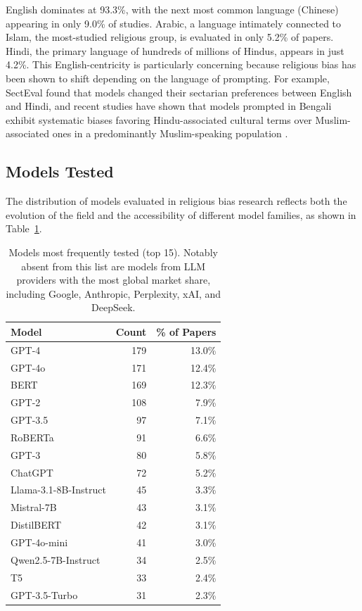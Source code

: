\documentclass[]{fairmeta}
\begin{document}
English dominates at 93.3\%, with the next most common language (Chinese) appearing in only 9.0\% of studies. Arabic, a language intimately connected to Islam, the most-studied religious group, is evaluated in only 5.2\% of papers. Hindi, the primary language of hundreds of millions of Hindus, appears in just 4.2\%. This English-centricity is particularly concerning because religious bias has been shown to shift depending on the language of prompting. For example, SectEval \citep{maheshwari2026} found that models changed their sectarian preferences between English and Hindi, and recent studies have shown that models prompted in Bengali exhibit systematic biases favoring Hindu-associated cultural terms over Muslim-associated ones in a predominantly Muslim-speaking population \cite{kabir2026xcrbench}.

\subsection{Models Tested}

The distribution of models evaluated in religious bias research reflects both the evolution of the field and the accessibility of different model families, as shown in Table~\ref{tab:models}.

\begin{table}[htbp]
\centering
\caption{Models most frequently tested (top 15). Notably absent from this list are models from LLM providers with the most global market share, including Google, Anthropic, Perplexity, xAI, and DeepSeek.}
\label{tab:models}
\begin{tabular}{lrr}
\toprule
\textbf{Model} & \textbf{Count} & \textbf{\% of Papers} \\
\midrule
GPT-4 & 179 & 13.0\% \\
GPT-4o & 171 & 12.4\% \\
BERT & 169 & 12.3\% \\
GPT-2 & 108 & 7.9\% \\
GPT-3.5 & 97 & 7.1\% \\
RoBERTa & 91 & 6.6\% \\
GPT-3 & 80 & 5.8\% \\
ChatGPT & 72 & 5.2\% \\
Llama-3.1-8B-Instruct & 45 & 3.3\% \\
Mistral-7B & 43 & 3.1\% \\
DistilBERT & 42 & 3.1\% \\
GPT-4o-mini & 41 & 3.0\% \\
Qwen2.5-7B-Instruct & 34 & 2.5\% \\
T5 & 33 & 2.4\% \\
GPT-3.5-Turbo & 31 & 2.3\% \\
\bottomrule
\end{tabular}
\end{table}
\end{document}
